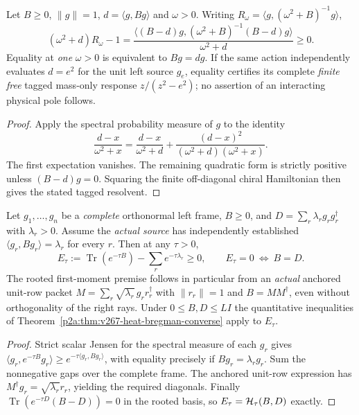 \documentclass[12pt,a4paper]{article}
\begin{document}
\begin{theorem}
\label{p2a:thm:v267-one-frequency-tagged}
Let $B\geq0$, $\|g\|=1$, $d=\langle g,Bg\rangle$ and $\omega>0$.
Writing $R_\omega=\langle g,(\omega^2+B)^{-1}g\rangle$,
\begin{equation}\label{p2a:eq:v267-tagged-jensen}
 \boxed{(\omega^2+d)R_\omega-1
 =\frac{\langle (B-d)g,(\omega^2+B)^{-1}(B-d)g\rangle}
 {\omega^2+d}\geq0.}
\end{equation}
Equality at \emph{one} $\omega>0$ is equivalent to $Bg=dg$.
If the same action independently evaluates $d=e^2$ for the unit left
source $g_e$, equality certifies its complete \emph{finite free}
tagged mass-only response $z/(z^2-e^2)$; no assertion of an interacting
physical pole follows.
\end{theorem}
\begin{proof}
Apply the spectral probability measure of $g$ to the identity
\[
 \frac{d-x}{\omega^2+x}=
 \frac{d-x}{\omega^2+d}
 +\frac{(d-x)^2}{(\omega^2+d)(\omega^2+x)}.
\]
The first expectation vanishes.  The remaining quadratic form is
strictly positive unless $(B-d)g=0$.  Squaring the finite off-diagonal
chiral Hamiltonian then gives the stated tagged resolvent.
\end{proof}

\begin{theorem}
\label{p2a:thm:v267-rooted-one-heat}
Let $g_1,\ldots,g_n$ be a \emph{complete} orthonormal left frame,
$B\geq0$, and $D=\sum_r\lambda_rg_rg_r^\dagger$ with $\lambda_r>0$.
Assume the \emph{actual source} has independently established
$\langle g_r,Bg_r\rangle=\lambda_r$ for every $r$. Then at any
$\tau>0$,
\[
 \boxed{E_\tau:=\operatorname{Tr}(e^{-\tau B})
 -\sum_re^{-\tau\lambda_r}\geq0,\qquad
 E_\tau=0\ \Longleftrightarrow\ B=D.}
\]
The rooted first-moment premise follows in particular from an
\emph{actual} anchored unit-row packet
$M=\sum_r\sqrt{\lambda_r}\,g_rr_r^\dagger$ with $\|r_r\|=1$
and $B=MM^\dagger$, even without orthogonality of the right rays.
Under $0\leq B,D\leq LI$ the quantitative inequalities of
Theorem~\ref{p2a:thm:v267-heat-bregman-converse} apply to $E_\tau$.
\end{theorem}
\begin{proof}
Strict scalar Jensen for the spectral measure of each $g_r$ gives
$\langle g_r,e^{-\tau B}g_r\rangle\geq
 e^{-\tau\langle g_r,Bg_r\rangle}$, with equality precisely if
$Bg_r=\lambda_rg_r$.  Sum the nonnegative gaps over the complete
frame.  The anchored unit-row expression has
$M^\dagger g_r=\sqrt{\lambda_r}r_r$, yielding the required diagonals.
Finally $\operatorname{Tr}(e^{-\tau D}(B-D))=0$ in the rooted basis,
so $E_\tau={\cal H}_\tau(B,D)$ exactly.
\end{proof}
\end{document}
